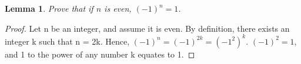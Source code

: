 \documentclass{article}
\newtheorem{lemma}{Lemma}
\begin{document}
\begin{lemma}
Prove that if $n$ is even, \((-1)^n = 1\).
\end{lemma}
 
\begin{proof}
Let n be an integer, and assume it is even. By definition, there exists an integer k such that n = 2k.
  Hence, \((-1)^n = (-1)^{2k} = (-1^2)^k\). \((-1)^2 = 1\), and 1 to the power of any number k equates to 1.  
\end{proof}
\end{document}
